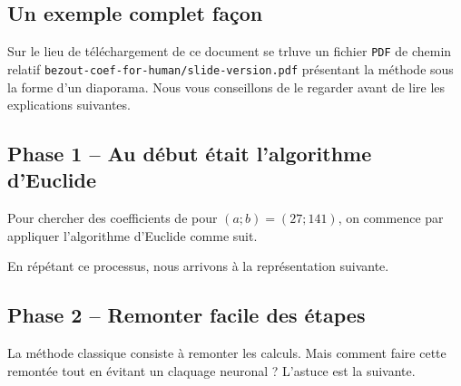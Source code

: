 \subsection{Un exemple complet façon }

Sur le lieu de téléchargement de ce document se trluve un fichier \verb+PDF+ de chemin relatif \verb+bezout-coef-for-human/slide-version.pdf+ présentant la méthode sous la forme d'un diaporama. Nous vous conseillons de le regarder avant de lire les explications suivantes.




\subsection{Phase 1 -- Au début était l'algorithme d'Euclide}

Pour chercher des coefficients de \bb pour $(a ; b) = (27 ; 141)$, on commence par appliquer l'algorithme d'Euclide  comme suit.

\begin{multicols}{2}

	\columnbreak
	
\end{multicols}

\begin{multicols}{2}

	\columnbreak
	
\end{multicols}


\medskip


En répétant ce processus, nous arrivons à la représentation suivante.





\subsection{Phase 2 -- Remonter facile des étapes}

La méthode classique consiste à remonter les calculs. Mais comment faire cette remontée tout en évitant un claquage neuronal ? L'astuce est la suivante.

